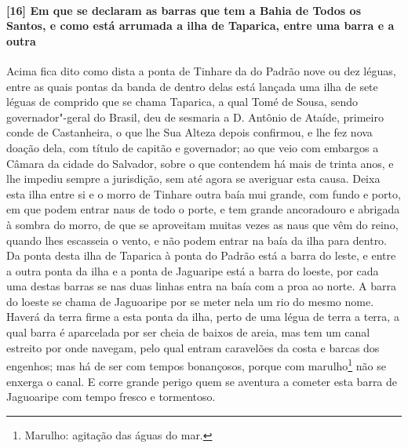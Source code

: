 \begin{linenumbers}
\paragraph{[16] Em que se declaram as barras que tem a Bahia de Todos os Santos, e como está
arrumada a ilha de Taparica, entre uma barra e a outra} \quad
Acima fica dito como dista a ponta de Tinhare da do Padrão nove ou dez léguas, entre as
quais pontas da banda de dentro delas está lançada uma ilha de sete léguas de comprido que
se chama Taparica, a qual Tomé de Sousa, sendo governador"-geral do Brasil, deu de sesmaria
a D. Antônio de Ataíde, primeiro conde de Castanheira, o que lhe Sua Alteza depois
confirmou, e lhe fez nova doação dela, com título de capitão e governador; ao que veio com
embargos a Câmara da cidade do Salvador, sobre o que contendem há mais de trinta anos, e
lhe impediu sempre a jurisdição, sem até agora se averiguar esta causa. Deixa esta ilha
entre si e o morro de Tinhare outra baía mui grande, com fundo e porto, em que podem
entrar naus de todo o porte, e tem grande ancoradouro e abrigada à sombra do morro, de que
se aproveitam muitas vezes as naus que vêm do reino, quando lhes escasseia o vento, e não
podem entrar na baía da ilha para dentro. Da ponta desta ilha de Taparica à ponta do
Padrão está a barra do leste, e entre a outra ponta da ilha e a 
ponta de Jaguaripe está a barra do loeste, por cada uma destas barras se 
nas duas linhas entra na baía com a proa ao norte. A barra do loeste se chama de Jaguoaripe
por se meter nela um rio do mesmo nome. Haverá da terra firme a esta ponta da ilha, perto
de uma légua de terra a terra, a qual barra é aparcelada por ser cheia de baixos de areia,
mas tem um canal estreito por onde navegam, pelo qual entram caravelões da costa e barcas
dos engenhos; mas há de ser com tempos bonançosos, porque com marulho\footnote{ Marulho:
agitação das águas do mar.} não se enxerga o canal. E corre grande perigo quem se aventura
a cometer esta barra de Jaguoaripe com tempo fresco e tormentoso.


\end{linenumbers}
